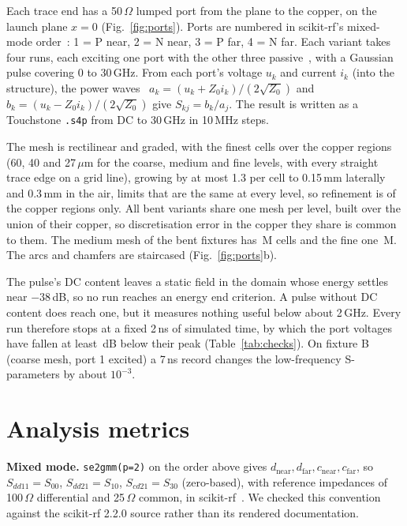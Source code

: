 \documentclass[10pt,twocolumn]{article}
\newcommand{\Sdd}[1]{S_{dd#1}}
\newcommand{\Scd}[1]{S_{cd#1}}
\begin{document}
Each trace end has a 50\,$\Omega$ lumped port from the plane to the copper, on the launch plane $x = 0$
(Fig.~\ref{fig:ports}). Ports are numbered in scikit-rf's mixed-mode order~\cite{skrf_se2gmm}: 1 = P near,
2 = N near, 3 = P far, 4 = N far. Each variant takes four runs, each exciting one port with the other three
passive~\cite{openems_ports}, with a Gaussian pulse covering 0 to 30\,GHz. From each port's voltage $u_k$ and
current $i_k$ (into the structure), the power waves~\cite{kurokawa1965}
$a_k = (u_k + Z_0 i_k)/(2\sqrt{Z_0})$ and $b_k = (u_k - Z_0 i_k)/(2\sqrt{Z_0})$ give $S_{kj} = b_k/a_j$. The
result is written as a Touchstone \texttt{.s4p} from DC to 30\,GHz in 10\,MHz steps.

The mesh is rectilinear and graded, with the finest cells over the copper regions (60, 40 and 27\,$\mu$m for the coarse,
medium and fine levels, with every straight trace edge on a grid line), growing by at most 1.3 per cell to
0.15\,mm laterally and 0.3\,mm in the air, limits that are the same at every level, so refinement is of the
copper regions only. All bent variants share one mesh per level, built over the union of
their copper, so discretisation error in the copper they share is common to them. The medium mesh of the bent
fixtures has \CellsMedium\,M cells and the fine one \CellsFine\,M. The arcs and chamfers are staircased
(Fig.~\ref{fig:ports}b).

The pulse's DC content leaves a static field in the domain whose energy settles near $-38$\,dB, so no run
reaches an energy end criterion. A pulse without DC content does reach one, but it measures nothing useful below
about 2\,GHz. Every run therefore stops at a fixed 2\,ns of simulated time, by which the port voltages have
fallen at least \TruncWorst\,dB below their peak (Table~\ref{tab:checks}). On fixture B (coarse mesh, port 1
excited) a 7\,ns record changes the low-frequency S-parameters by about $10^{-3}$.

\section{Analysis metrics}
\label{sec:metrics}

\textbf{Mixed mode.} \texttt{se2gmm(p=2)} on the order above gives $d_\mathrm{near}, d_\mathrm{far},
c_\mathrm{near}, c_\mathrm{far}$, so $\Sdd{11}=S_{00}$, $\Sdd{21}=S_{10}$, $\Scd{21}=S_{30}$ (zero-based), with
reference impedances of 100\,$\Omega$ differential and 25\,$\Omega$ common, in scikit-rf~\cite{arsenovic2022}. We
checked this convention against the scikit-rf 2.2.0 source rather than its rendered documentation.
\end{document}
